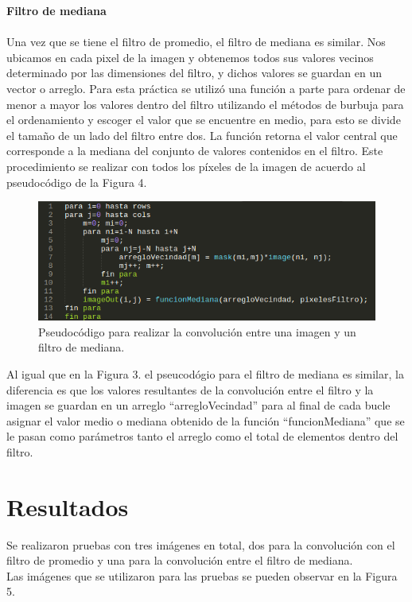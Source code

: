 \documentclass[conference]{IEEEtran}
\begin{document}
\textbf{Filtro de mediana\\\\}
Una vez que se tiene el filtro de promedio, el filtro de mediana es similar. Nos ubicamos en cada pixel de la imagen y obtenemos todos sus valores vecinos determinado por las dimensiones del filtro, y dichos valores se guardan en un vector o arreglo. Para esta pr\'actica se utiliz\'o una funci\'on a parte para ordenar de menor a mayor los valores dentro del filtro utilizando el m\'etodos de burbuja para el ordenamiento y escoger el valor que se encuentre en medio, para esto se divide el tama\~no de un lado del filtro entre dos. La funci\'on retorna el valor central que corresponde a la mediana del conjunto de valores contenidos en el filtro. Este procedimiento se realizar con todos los p\'ixeles de la imagen de acuerdo al pseudoc\'odigo de la Figura 4.

\begin{figure}[h]
	\begin{center}
		\setlength{\unitlength}{0.00105in}
		\includegraphics[scale=0.45]{./images/median.png}
	\end{center}
	\caption{Pseudoc\'odigo para realizar la convoluci\'on entre una imagen y un filtro de mediana.}
\end{figure}

Al igual que en la Figura 3. el pseucod\'ogio para el filtro de mediana es similar, la diferencia es que los valores resultantes de la convoluci\'on entre el filtro y la imagen se guardan en un arreglo ``arregloVecindad'' para al final de cada bucle asignar el valor medio o mediana obtenido de la funci\'on ``funcionMediana'' que se le pasan como par\'ametros tanto el arreglo como el total de elementos dentro del filtro.\\

\section{Resultados}
Se realizaron pruebas con tres im\'agenes en total, dos para la convoluci\'on con el filtro de promedio y una para la convoluci\'on entre el filtro de mediana.\\
Las im\'agenes que se utilizaron para las pruebas se pueden observar en la Figura 5.
\end{document}
